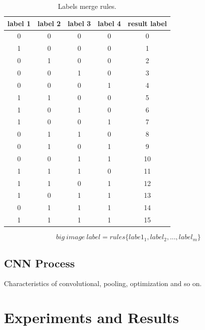 \documentclass[sensors,article,submit,moreauthors,pdftex,10pt,a4paper]{mdpi}
\begin{document}
\begin{table}[H]
\caption{Labels merge rules.}
\centering
\begin{tabular}{cccc|c}
\toprule
\textbf{label 1}	& \textbf{label 2}	& \textbf{label 3}	& \textbf{label 4}	& \textbf{result label}\\
\midrule
0		& 0			& 0				&0					&0\\
1		& 0			& 0				&0					&1\\
0		& 1			& 0				&0					&2\\
0		& 0			& 1				&0					&3\\
0		& 0			& 0				&1					&4\\
1		& 1			& 0				&0					&5\\
1		& 0			& 1				&0					&6\\
1		& 0			& 0				&1					&7\\
0		& 1			& 1				&0					&8\\
0		& 1			& 0				&1					&9\\
0		& 0			& 1				&1					&10\\
1		& 1			& 1				&0					&11\\
1		& 1			& 0				&1					&12\\
1		& 0			& 1				&1					&13\\
0		& 1			& 1				&1					&14\\
1		& 1			& 1				&1					&15\\
\bottomrule
\end{tabular}
\label{LabelsMergeRules}
\end{table}

\begin{equation}
big\ image\ label = rules\{labe1_1, label_2, ..., label_m\}
\end{equation}

\subsection{CNN Process}

Characteristics of convolutional, pooling, optimization and so on.  

\section{Experiments and Results}
\end{document}
